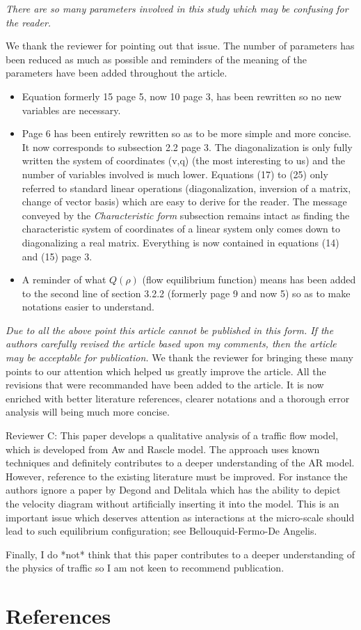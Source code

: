 \documentclass{article}
\begin{document}
\bigskip{}

\emph{
There are so many parameters involved in this study which may be confusing for the reader.
}

We thank the reviewer for pointing out that issue. The number of parameters has been reduced as much as possible and reminders of the meaning of the parameters have been added throughout the article.

\begin{itemize}
\item Equation formerly 15 page 5, now 10 page 3, has been rewritten so no new variables are necessary.
\item Page 6 has been entirely rewritten so as to be more simple and more concise. It now corresponds to subsection 2.2 page 3. The diagonalization is only fully written the system of coordinates (v,q) (the most interesting to us) and the number of variables involved is much lower. Equations (17) to (25) only referred to standard linear operations (diagonalization, inversion of a matrix, change of vector basis) which are easy to derive for the reader. The message conveyed by the \textit{Characteristic form} subsection remains intact as finding the characteristic system of coordinates of a linear system only comes down to diagonalizing a real matrix. Everything is now contained in equations (14) and (15) page 3.
\item A reminder of what $Q(\rho)$ (flow equilibrium function) means has been added to the second line of section 3.2.2 (formerly page 9 and now 5) so as to make notations easier to understand.
\end{itemize}

\bigskip{}

\emph{
Due to all the above point this article cannot be published in this form. If the authors carefully revised the article based upon my comments, then the article may be acceptable for publication.
}
We thank the reviewer for bringing these many points to our attention which helped us greatly improve the article. All the revisions that were recommanded have been added to the article. It is now enriched with better literature references, clearer notations and a thorough error analysis will being much more concise.


\newpage

Reviewer C: This paper develops a qualitative analysis of a traffic flow model, which is developed from Aw and Rascle model. The approach uses known techniques and definitely contributes to a deeper understanding of the AR model. However, reference to the existing literature must be improved. For instance the authors ignore a paper by Degond and Delitala which has the ability to depict the velocity diagram without artificially inserting it into the model. This is an important issue which deserves attention as interactions at the micro-scale should lead to such equilibrium configuration; see Bellouquid-Fermo-De Angelis.

Finally, I do *not* think that this paper contributes to a deeper understanding of the physics of traffic so I am not keen to recommend publication.

\section*{References}

\end{document}

